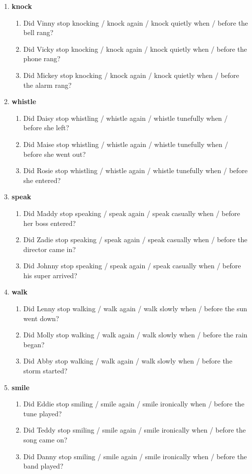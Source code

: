 \documentclass[a4paper,12pt]{article}
\newcommand{\6}{\mbox{$[\hspace*{-.6mm}[$}}
\newcommand{\9}{\mbox{$]\hspace*{-.6mm}]$}}
\begin{document}
\begin{enumerate}[leftmargin=3ex,itemsep=-4pt]
\item {\bf knock}
\begin{enumerate}[leftmargin=2ex,itemsep=-4pt]
\item Did Vinny stop knocking / knock again	 / knock quietly	when / before the bell rang?
\item Did Vicky stop knocking / knock again	 / knock quietly	when / before the phone rang?
\item Did Mickey stop knocking	 / knock again / knock quietly	when / before the alarm rang?
\end{enumerate}

\item {\bf whistle}
\begin{enumerate}[leftmargin=2ex,itemsep=-4pt]
\item  Did Daisy stop whistling	 / whistle again / whistle tunefully when /	before she left?
\item Did Maise stop whistling	/ whistle again	 / whistle tunefully when /	before she went out?
\item Did Rosie stop whistling / whistle again	/ whistle tunefully	when / before she entered?
\end{enumerate}


\item {\bf speak}
\begin{enumerate}[leftmargin=2ex,itemsep=-4pt]
\item Did Maddy stop speaking / speak again	/ speak casually when /	before her boss entered?
\item Did Zadie stop speaking	/ speak again	/ speak casually when / before the director came in?
\item Did Johnny stop speaking / speak again	/ speak casually when / before his super arrived?
\end{enumerate}


\item {\bf walk}
\begin{enumerate}[leftmargin=2ex,itemsep=-4pt]
\item Did Lenny stop walking	/ walk again / walk slowly	when / before the sun went down?
\item Did Molly stop walking / walk again / walk slowly	when / before the rain began?
\item Did Abby stop walking	/  walk again	/ walk slowly when / before the storm started?
\end{enumerate}



\item {\bf smile}
\begin{enumerate}[leftmargin=2ex,itemsep=-4pt]
\item Did Eddie stop smiling / smile again / smile ironically when /	before the tune played?
\item Did Teddy stop smiling / smile again / smile ironically	when / before the song came on?
\item Did Danny stop smiling / smile again	/ smile ironically	when / before the band played?
\end{enumerate}



\end{enumerate}
\end{document}

